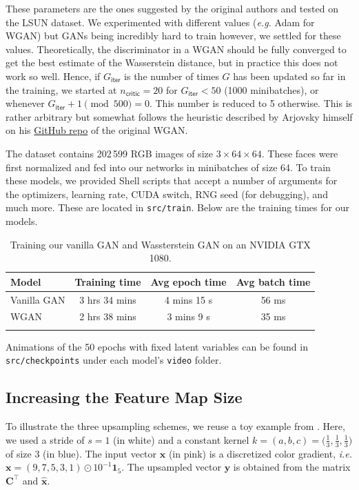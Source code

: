 \documentclass[table]{article}
\def\*#1{\mathbf{#1}}
\newcommand{\code}[1]{{\color{Blue}\small\texttt{#1}}}
\begin{document}
These parameters are the ones suggested by the original authors and tested on the LSUN dataset. We experimented with different values (\textit{e.g.} Adam for WGAN) but GANs being incredibly hard to train however, we settled for these values. Theoretically, the discriminator in a WGAN should be fully converged to get the best estimate of the Wasserstein distance, but in practice this does not work so well. Hence, if $G_\textsf{iter}$ is the number of times $G$ has been updated so far in the training, we started at $n_\textsf{critic} = 20$ for $G_\textsf{iter} < 50$ (1000 minibatches), or whenever $G_\textsf{iter}+1 \pmod{500} = 0$. This number is reduced to 5 otherwise. This is rather arbitrary but somewhat follows the heuristic described by Arjovsky himself on his \href{https://github.com/martinarjovsky/wassersteingan}{GitHub repo} of the original WGAN.

The dataset contains 202\,599 RGB images of size $3 \times 64 \times 64$. These faces were first normalized and fed into our networks in minibatches of size 64. To train these models, we provided Shell scripts that accept a number of arguments for the optimizers, learning rate, CUDA switch, RNG seed (for debugging), and much more. These are located in \code{src/train}. Below are the training times for our models.

\begin{table}[ht]
\centering
\begin{tabular}{l c c c}
\Xhline{2\arrayrulewidth}
Model & Training time & Avg epoch time & Avg batch time \\
\hline
Vanilla GAN & 3 hrs 34 mins & 4 mins 15 s & 56 ms  \\
WGAN & 2 hrs 38 mins & 3 mins 9 s & 35 ms \\
\Xhline{2\arrayrulewidth}
\end{tabular}
\caption{Training our vanilla GAN and Wassterstein GAN on an NVIDIA GTX 1080.}
\end{table}

Animations of the 50 epochs with fixed latent variables can be found in \code{src/checkpoints} under each model's \code{video} folder.

\subsection{Increasing the Feature Map Size}

To illustrate the three upsampling schemes, we reuse a toy example from \cite{odena2016deconvolution}. Here, we used a stride of $s=1$ (in white) and a constant kernel $k=(a,b,c) = \big(\frac{1}{3}, \frac{1}{3},\frac{1}{3}\big)$ of size 3 (in blue). The input vector $\*x$ (in pink) is a discretized color gradient, \textit{i.e.} $\*x = (9,7,5,3,1) \odot 10^{-1} \*1_5$. The upsampled vector $\*y$ is obtained from the matrix $\*C^\top$ and $\*{\hat x}$.
\end{document}
